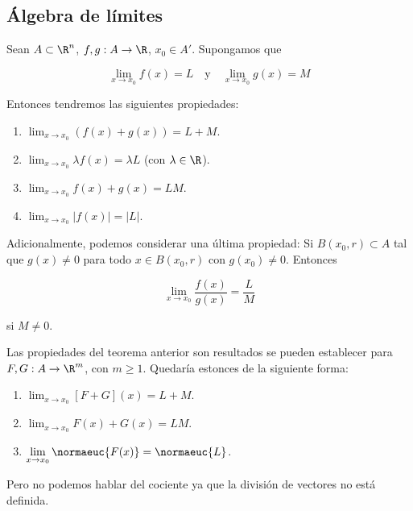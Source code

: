 \subsection{Álgebra de límites}

\begin{teo}
    Sean $A \subset \R^n$, $f, g : A \rightarrow \R$, $x_0 \in A'$. Supongamos que

    \[
    \lim_{x \to x_0} f(x) = L \quad \text{y} \quad \lim_{x \to x_0} g(x) = M
    \]
    
    Entonces tendremos las siguientes propiedades:
    
    \begin{enumerate}
        \item $\displaystyle \lim_{x \to x_0} \left( f(x) + g(x) \right) = L + M$.
        \item $\displaystyle \lim_{x \to x_0} \lambda f(x) = \lambda L$ (con $\lambda \in \R$).
        \item $\displaystyle \lim_{x \to x_0} f(x) + g(x) = LM$.
        \item $\displaystyle \lim_{x \to x_0} \left| f(x) \right| = |L|$.
    \end{enumerate}
    
    Adicionalmente, podemos considerar una última propiedad: Si $B(x_0, r) \subset A$ tal que $g(x) \neq 0$ para todo $x \in B(x_0, r)$ con $g(x_0) \neq 0$. Entonces
    
    \[
    \lim_{x \to x_0} \frac{f(x)}{g(x)} = \frac{L}{M}
    \]
    
    \noindent si $M \neq 0$.
\end{teo}

\begin{aco}
    Las propiedades del teorema anterior son resultados se pueden establecer para $F, G: A \rightarrow \R^m$, con $m \geq 1$. Quedaría estonces de la siguiente forma:
    
    \begin{enumerate}
        \item $\displaystyle \lim_{x \to x_0} \left[ F + G \right](x) = L + M$.
        \item $\displaystyle \lim_{x \to x_0} F(x) + G(x) = LM$.
        \item $\displaystyle \lim_{x \to x_0} \normaeuc{F(x)} = \normaeuc{L}$.
    \end{enumerate}
    
    Pero no podemos hablar del cociente ya que la división de vectores no está definida.
\end{aco}

